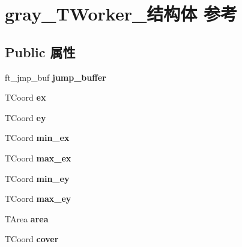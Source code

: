 \hypertarget{structgray___t_worker__}{}\section{gray\+\_\+\+T\+Worker\+\_\+结构体 参考}
\label{structgray___t_worker__}
\subsection*{Public 属性}
\begin{DoxyCompactItemize}
\item 
\mbox{\label{structgray___t_worker___aaf6c16d2d63e6929fa1862f26fdf2e7a}} 
ft\+\_\+jmp\+\_\+buf {\bfseries jump\+\_\+buffer}
\item 
\mbox{\label{structgray___t_worker___a22e4cb2c697bd4a7ccbd3cf8e5775f8a}} 
T\+Coord {\bfseries ex}
\item 
\mbox{\label{structgray___t_worker___a64b4f060baae3892096b074ffe0f3286}} 
T\+Coord {\bfseries ey}
\item 
\mbox{\label{structgray___t_worker___a7fc7f32f0c625dbdbaaefa99ff758933}} 
T\+Coord {\bfseries min\+\_\+ex}
\item 
\mbox{\label{structgray___t_worker___a68642c00535da344505a08a18f4f5df6}} 
T\+Coord {\bfseries max\+\_\+ex}
\item 
\mbox{\label{structgray___t_worker___af071f4dc18db58f381d57c432bc06feb}} 
T\+Coord {\bfseries min\+\_\+ey}
\item 
\mbox{\label{structgray___t_worker___abc2ebcb59fb92ee2c7701a2d4c273580}} 
T\+Coord {\bfseries max\+\_\+ey}
\item 
\mbox{\label{structgray___t_worker___a521353c13ba4e1a3abc5df214ace6f60}} 
T\+Area {\bfseries area}
\item 
\mbox{\label{structgray___t_worker___affb2d8883eaca03a90070cdc8a9c95e9}} 
T\+Coord {\bfseries cover}

\end{DoxyCompactItemize}
